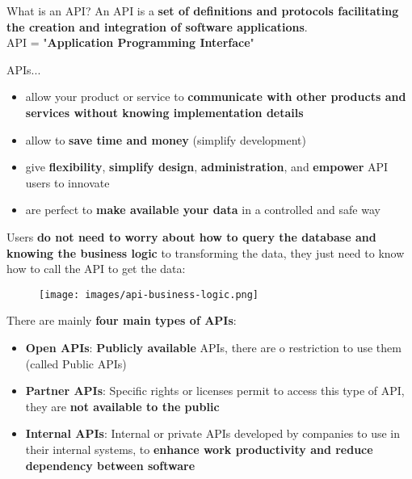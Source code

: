 \documentclass{beamer}[10pt, usepdftitle=false handout]
\begin{document}
	\begin{frame}
	
	\begin{block}{What is an API?}
	An API is a \textbf{set of definitions and protocols facilitating the creation and integration of software applications}. \\ 
	API = "\textbf{Application Programming Interface}"
	\end{block}
	\vspace*{0.6em}

	APIs...
	\vspace*{0.6em}
	
	\begin{itemize}
	\item{allow your product or service to \textbf{communicate with other products and services without knowing implementation details}}
	\item{allow to \textbf{save time and money} (simplify development)}
	\item{give \textbf{flexibility}, \textbf{simplify design}, \textbf{administration}, and \textbf{empower} API users to innovate}
	\item{are perfect to \textbf{make available your data} in a controlled and safe way}
	\end{itemize}
	
	\end{frame}
	
	\begin{frame}
	
Users \textbf{do not need to worry about how to query the database and knowing the business logic} to transforming the data, they just need to know how to call the API to get the data:
\vspace*{0.6em}

	\begin{figure}
	\texttt{[image: images/api-business-logic.png]} 
	\end{figure}

	\end{frame}	
	
	\begin{frame}
	
	There are mainly \textbf{four main types of APIs}: 
	\vspace*{0.6em}

	\begin{itemize}
	\item{\textbf{Open APIs}: \textbf{Publicly available} APIs, there are o restriction to use them (called Public APIs)}
	\item{\textbf{Partner APIs}: Specific rights or licenses permit to access this type of API, they are \textbf{not available to the public}}
	\item{\textbf{Internal APIs}: Internal or private APIs developed by companies to use in their internal systems, to \textbf{enhance work productivity and reduce dependency between software}}	
	\end{itemize}
 
    \end{frame}	
	
\end{document}
